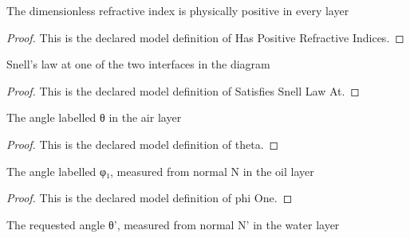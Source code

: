 \begin{definition}
  \label{def:physics:phyx-mini-0000:phyxminiproblems-problemphyxmini0000-haspositiverefractiveindices}
  The dimensionless refractive index is physically positive in every layer
\end{definition}
\begin{proof}
  This is the declared model definition of Has Positive Refractive Indices.
\end{proof}
\begin{definition}
  \label{def:physics:phyx-mini-0000:phyxminiproblems-problemphyxmini0000-satisfiessnelllawat}
  Snell's law at one of the two interfaces in the diagram
\end{definition}
\begin{proof}
  This is the declared model definition of Satisfies Snell Law At.
\end{proof}
\begin{definition}[theta]
  \label{def:physics:phyx-mini-0000:phyxminiproblems-problemphyxmini0000-theta}
  The angle labelled θ in the air layer
\end{definition}
\begin{proof}
  This is the declared model definition of theta.
\end{proof}
\begin{definition}
  \label{def:physics:phyx-mini-0000:phyxminiproblems-problemphyxmini0000-phione}
  The angle labelled φ₁, measured from normal N in the oil layer
\end{definition}
\begin{proof}
  This is the declared model definition of phi One.
\end{proof}
\begin{definition}
  \label{def:physics:phyx-mini-0000:phyxminiproblems-problemphyxmini0000-thetaprime}
  The requested angle θ', measured from normal N' in the water layer
\end{definition}
